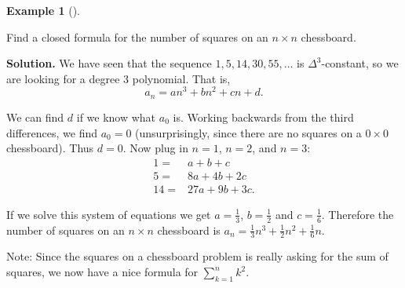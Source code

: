 \documentclass[10pt,]{book}
\theoremstyle{plain}
\theoremstyle{definition}
\newtheorem{example}[theorem]{Example}
\theoremstyle{definition}
\theoremstyle{definition}
\numberwithin{equation}{chapter}
\def\d{\displaystyle}
\newcommand{\amp}{ & }
\begin{document}
\begin{example}[]\label{example-70}

Find a closed formula for the number of squares on an \(n \times n\) chessboard.
%
\par\medskip\noindent%
\textbf{Solution.}\quad
We have seen that the sequence \(1, 5, 14, 30, 55, \ldots\) is \(\Delta^3\)-constant, so we are looking for a degree 3 polynomial. That is,
\begin{equation*}
  a_n = an^3 + bn^2 + cn + d.
\end{equation*}
%
\par

We can find \(d\) if we know what \(a_0\) is. Working backwards from the third differences, we find \(a_0 = 0\) (unsurprisingly, since there are no squares on a \(0\times 0\) chessboard). Thus \(d = 0\). Now plug in \(n = 1\), \(n =2\), and \(n =3\):
\begin{align*}
  1 = \amp  a + b + c\\
  5 = \amp  8a + 4b + 2c\\
  14 = \amp  27a + 9b + 3c.
\end{align*}
%
\par

If we solve this system of equations we get \(a = \frac{1}{3}\), \(b = \frac{1}{2}\) and \(c = \frac{1}{6}\). Therefore the number of squares on an \(n \times n\) chessboard is \(a_n = \frac{1}{3}n^3 + \frac{1}{2}n^2 + \frac{1}{6}n\).
%

Note: Since the squares on a chessboard problem is really asking for the sum of squares, we now have a nice formula for \(\d\sum_{k=1}^n k^2\).
%
\end{example}
\par
\end{document}
